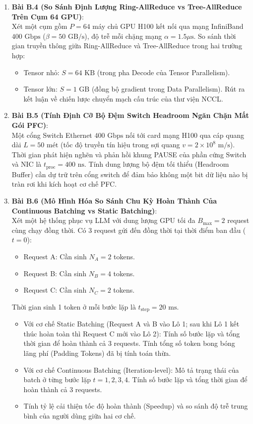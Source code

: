 \begin{enumerate}
  \item \textbf{Bài B.4 (So Sánh Định Lượng Ring-AllReduce vs Tree-AllReduce Trên Cụm 64 GPU)}: \\
  Xét một cụm gồm $P = 64$ máy chủ GPU H100 kết nối qua mạng InfiniBand $400\text{ Gbps}$ ($\beta = 50\text{ GB/s}$), độ trễ mỗi chặng mạng $\alpha = 1.5\mu\text{s}$.
  So sánh thời gian truyền thông giữa Ring-AllReduce và Tree-AllReduce trong hai trường hợp:
  \begin{itemize}
    \item[a)] Tensor nhỏ: $S = 64\text{ KB}$ (trong pha Decode của Tensor Parallelism).
    \item[b)] Tensor lớn: $S = 1\text{ GB}$ (đồng bộ gradient trong Data Parallelism). Rút ra kết luận về chiến lược chuyển mạch cấu trúc của thư viện NCCL.
  \end{itemize}

  \item \textbf{Bài B.5 (Tính Định Cỡ Bộ Đệm Switch Headroom Ngăn Chặn Mất Gói PFC)}: \\
  Một cổng Switch Ethernet $400\text{ Gbps}$ nối tới card mạng H100 qua cáp quang dài $L = 50\text{ mét}$ (tốc độ truyền tín hiệu trong sợi quang $v = 2 \times 10^8\text{ m/s}$).
  Thời gian phát hiện nghẽn và phản hồi khung PAUSE của phần cứng Switch và NIC là $t_{\text{proc}} = 400\text{ ns}$.
  Tính dung lượng bộ đệm tối thiểu (Headroom Buffer) cần dự trữ trên cổng switch để đảm bảo không một bit dữ liệu nào bị tràn rơi khi kích hoạt cơ chế PFC.

  \item \textbf{Bài B.6 (Mô Hình Hóa So Sánh Chu Kỳ Hoàn Thành Của Continuous Batching vs Static Batching)}: \\
  Xét một hệ thống phục vụ LLM với dung lượng GPU tối đa $B_{\max} = 2$ request cùng chạy đồng thời.
  Có 3 request gửi đến đồng thời tại thời điểm ban đầu ($t = 0$):
  \begin{itemize}
    \item Request A: Cần sinh $N_A = 2$ tokens.
    \item Request B: Cần sinh $N_B = 4$ tokens.
    \item Request C: Cần sinh $N_C = 2$ tokens.
  \end{itemize}
  Thời gian sinh 1 token ở mỗi bước lặp là $t_{\text{step}} = 20\text{ ms}$.
  \begin{itemize}
    \item[a)] Với cơ chế Static Batching (Request A và B vào Lô 1; sau khi Lô 1 kết thúc hoàn toàn thì Request C mới vào Lô 2): Tính số bước lặp và tổng thời gian để hoàn thành cả 3 requests. Tính tổng số token bong bóng lãng phí (Padding Tokens) đã bị tính toán thừa.
    \item[b)] Với cơ chế Continuous Batching (Iteration-level): Mô tả trạng thái của batch ở từng bước lặp $t=1, 2, 3, 4$. Tính số bước lặp và tổng thời gian để hoàn thành cả 3 requests.
    \item[c)] Tính tỷ lệ cải thiện tốc độ hoàn thành (Speedup) và so sánh độ trễ trung bình của người dùng giữa hai cơ chế.
  \end{itemize}
\end{enumerate}

